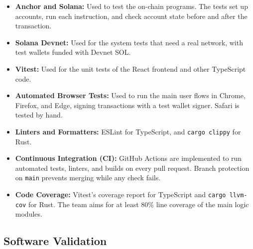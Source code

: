 \documentclass[12pt]{article}
\begin{document}
\begin{itemize}
  \item \textbf{Anchor and Solana: } Used to test the on-chain programs. The
  tests set up accounts, run each instruction, and check account state before and after the transaction.
  \item \textbf{Solana Devnet: } Used for the system tests that need a real network, with test wallets funded
  with Devnet SOL.
  \item \textbf{Vitest: } Used for the unit tests of the React frontend and other TypeScript code.
  \item \textbf{Automated Browser Tests: } Used to run the main user flows in Chrome, Firefox, and Edge,
  signing transactions with a test wallet signer. Safari is tested by hand.
  \item \textbf{Linters and Formatters: } ESLint for TypeScript, and \texttt{cargo clippy} for Rust.
  \item \textbf{Continuous Integration (CI): } GitHub Actions are implemented to run automated tests, linters, and builds on every pull request. Branch protection
  on \texttt{main} prevents merging while any check fails.
  \item \textbf{Code Coverage: } Vitest's coverage report for TypeScript and \texttt{cargo llvm-cov} for Rust.
  The team aims for at least 80\% line coverage of the main logic modules.
\end{itemize}

\subsection{Software Validation}




\end{document}
